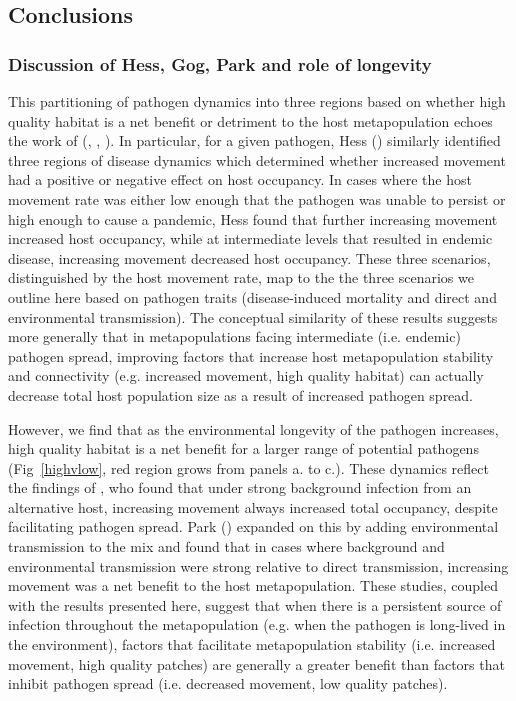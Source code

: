 \documentclass{article}
\begin{document}
\subsection*{Conclusions}  

\subsubsection*{Discussion of Hess, Gog, Park and role of longevity}

This partitioning of pathogen dynamics into three regions based on whether high quality habitat is a net benefit or detriment to the host metapopulation echoes the work of (\cite{Hess1996}, \cite{Gog2002}, \cite{Park2012}).
In particular, for a given pathogen, Hess (\cite{Hess1996}) similarly identified three regions of disease dynamics which determined whether increased movement had a positive or negative effect on host occupancy.  
In cases where the host movement rate was either low enough that the pathogen was unable to persist or high enough to cause a pandemic, Hess found that further increasing movement increased host occupancy, while at intermediate levels that resulted in endemic disease, increasing movement decreased host occupancy.
These three scenarios, distinguished by the host movement rate, map to the the three scenarios we outline here based on pathogen traits (disease-induced mortality and direct and environmental transmission).
The conceptual similarity of these results suggests more generally that in metapopulations facing intermediate (i.e. endemic) pathogen spread, improving factors that increase host metapopulation stability and connectivity (e.g. increased movement, high quality habitat) can actually decrease total host population size as a result of increased pathogen spread.

However, we find that as the environmental longevity of the pathogen increases, high quality habitat is a net benefit for a larger range of potential pathogens (Fig~\ref{highvlow}, red region grows from panels a. to c.).
These dynamics reflect the findings of \cite{Gog2002}, who found that under strong background infection from an alternative host, increasing movement always increased total occupancy, despite facilitating pathogen spread.  
Park (\cite{Park2012}) expanded on this by adding environmental transmission to the mix and found that in cases where background and environmental transmission were strong relative to direct transmission, increasing movement was a net benefit to the host metapopulation.  
These studies, coupled with the results presented here, suggest that when there is a persistent source of infection throughout the metapopulation (e.g. when the pathogen is long-lived in the environment), factors that facilitate metapopulation stability (i.e. increased movement, high quality patches) are generally a greater benefit than factors that inhibit pathogen spread (i.e. decreased movement, low quality patches). 
\end{document}
